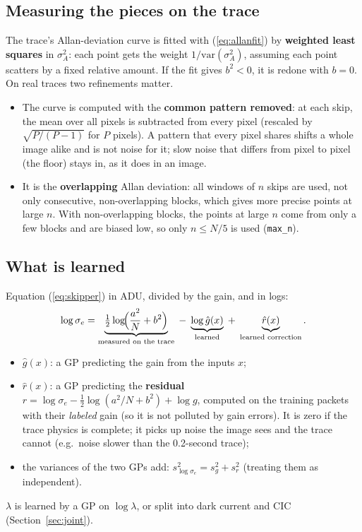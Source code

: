 \documentclass[11pt]{article}
\newcommand{\code}[1]{\texttt{#1}}
\begin{document}
\subsection{Measuring the pieces on the trace}
The trace's Allan-deviation curve is fitted with (\ref{eq:allanfit}) by \textbf{weighted least squares} in $\sigma_A^2$: each point
gets the weight $1/\mathrm{var}(\sigma_A^2)$, assuming each point scatters by a fixed relative amount. If the fit gives $b^2 < 0$,
it is redone with $b = 0$. On real traces two refinements matter.
\begin{itemize}
\item The curve is computed with the \textbf{common pattern removed}: at each skip, the mean over all pixels is subtracted from
  every pixel (rescaled by $\sqrt{P/(P-1)}$ for $P$ pixels). A pattern that every pixel shares shifts a whole image alike and is not
  noise for it; slow noise that differs from pixel to pixel (the floor) stays in, as it does in an image.
\item It is the \textbf{overlapping} Allan deviation: all windows of $n$ skips are used, not only consecutive, non-overlapping blocks,
  which gives more precise points at large $n$. With non-overlapping blocks, the points at large $n$ come from only a few blocks and
  are biased low, so only $n \leq N/5$ is used (\code{max\_n}).
\end{itemize}

\subsection{What is learned}
Equation (\ref{eq:skipper}) in ADU, divided by the gain, and in logs:
\begin{equation}
\log\sigma_e = \underbrace{\tfrac12\log\!\Bigl(\frac{a^2}{N} + b^2\Bigr)}_{\text{measured on the trace}}
\;-\;\underbrace{\log\hat g(x)}_{\text{learned}} \;+\;\underbrace{\hat r(x)}_{\text{learned correction}} .
\label{eq:modelA}
\end{equation}
\begin{itemize}
\item $\hat g(x)$: a GP predicting the gain from the inputs $x$;
\item $\hat r(x)$: a GP predicting the \textbf{residual} $r = \log\sigma_e - \tfrac12\log(a^2/N + b^2) + \log g$, computed on the
  training packets with their \emph{labeled} gain (so it is not polluted by gain errors). It is zero if the trace physics is
  complete; it picks up noise the image sees and the trace cannot (e.g.\ noise slower than the 0.2-second trace);
\item the variances of the two GPs add: $s^2_{\log\sigma_e} = s^2_g + s^2_r$ (treating them as independent).
\end{itemize}
$\lambda$ is learned by a GP on $\log\lambda$, or split into dark current and CIC (Section~\ref{sec:joint}).
\end{document}
